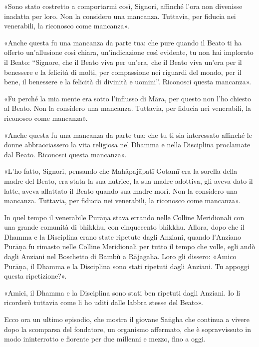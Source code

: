 «Sono stato costretto a comportarmi così, Signori, affinché l’ora non
divenisse inadatta per loro. Non la considero una mancanza. Tuttavia,
per fiducia nei venerabili, la riconosco come mancanza».


«Anche questa fu una mancanza da parte tua: che pure quando il Beato ti
ha offerto un’allusione così chiara, un’indicazione così evidente, tu
non hai implorato il Beato: “Signore, che il Beato viva per un’era, che
il Beato viva un’era per il benessere e la felicità di molti, per
compassione nei riguardi del mondo, per il bene, il benessere e la
felicità di divinità e uomini”. Riconosci questa mancanza».


«Fu perché la mia mente era sotto l’influsso di Māra, per questo non
l’ho chiesto al Beato. Non la considero una mancanza. Tuttavia, per
fiducia nei venerabili, la riconosco come mancanza».


«Anche questa fu una mancanza da parte tua: che tu ti sia interessato
affinché le donne abbracciassero la vita religiosa nel Dhamma e nella
Disciplina proclamate dal Beato. Riconosci questa mancanza».


«L’ho fatto, Signori, pensando che Mahāpajāpatī Gotamī era la sorella
della madre del Beato, era stata la sua nutrice, la sua madre adottiva,
gli aveva dato il latte, aveva allattato il Beato quando sua madre morì.
Non la considero una mancanza. Tuttavia, per fiducia nei venerabili, la
riconosco come mancanza».




In quel tempo il venerabile Purāṇa stava errando nelle Colline
Meridionali con una grande comunità di bhikkhu, con cinquecento bhikkhu.
Allora, dopo che il Dhamma e la Disciplina erano state ripetute dagli
Anziani, quando l’Anziano Purāṇa fu rimasto nelle Colline Meridionali
per tutto il tempo che volle, egli andò dagli Anziani nel Boschetto di
Bambù a Rājagaha. Loro gli dissero: «Amico Purāṇa, il Dhamma e la
Disciplina sono stati ripetuti dagli Anziani. Tu appoggi questa
ripetizione?».


«Amici, il Dhamma e la Disciplina sono stati ben ripetuti dagli Anziani.
Io li ricorderò tuttavia come li ho uditi dalle labbra stesse del
Beato».




 Ecco ora un ultimo episodio, che mostra il giovane
Saṅgha che continua a vivere dopo la scomparsa del fondatore, un
organismo affermato, che è sopravvissuto in modo ininterrotto e fiorente
per due millenni e mezzo, fino a oggi.


